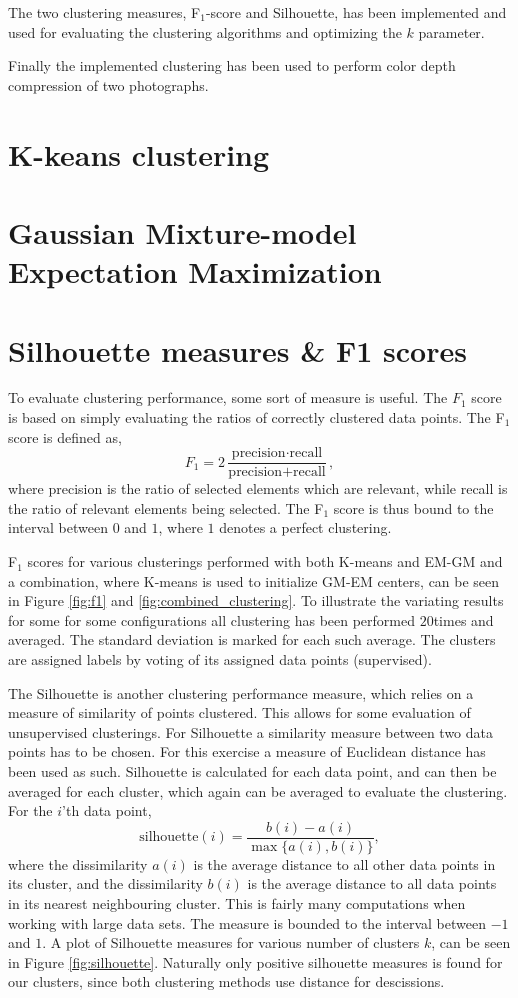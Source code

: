 \documentclass[a4paper,10pt,article,oneside,english]{memoir}
\begin{document}
The two clustering measures, F$_1$-score and Silhouette, has been implemented and used for evaluating the clustering algorithms and optimizing the $k$ parameter. 

Finally the implemented clustering has been used to perform color depth compression of two photographs. 

\section*{K-keans clustering}

\section*{Gaussian Mixture-model Expectation Maximization}



\section*{Silhouette measures \& F1 scores}
To evaluate clustering performance, some sort of measure is useful. The $F_1$ score is based on simply evaluating the ratios of correctly clustered data points. The F$_1$ score is defined as,
$$F_1 = 2 \frac{\text{precision} \cdot \text{recall}}{\text{precision} + \text{recall}},$$
where precision is the ratio of selected elements which are relevant, while recall is the ratio of relevant elements being selected. The F$_1$ score is thus bound to the interval between $0$ and $1$, where $1$ denotes a perfect clustering. 

F$_1$ scores for various clusterings performed with both K-means and EM-GM and a combination, where K-means is used to initialize GM-EM centers, can be seen in Figure \ref{fig:f1} and \ref{fig:combined_clustering}. To illustrate the variating results for some for some configurations all clustering has been performed $20$times and averaged. The standard deviation is marked for each such average. The clusters are assigned labels by voting of its assigned data points (supervised).


The Silhouette is another clustering performance measure, which relies on a measure of similarity of points clustered. This allows for some evaluation of unsupervised clusterings. For Silhouette a similarity measure between two data points has to be chosen. For this exercise a measure of Euclidean distance has been used as such. Silhouette is calculated for each data point, and can then be averaged for each cluster, which again can be averaged to evaluate the clustering. For the $i$'th data point,
$$ \text{silhouette}(i) = \frac{b(i) - a(i)}{\max\{a(i), b(i)\}},$$
where the dissimilarity $a(i)$ is the average distance to all other data points in its cluster, and the dissimilarity $b(i)$ is the average distance to all data points in its nearest neighbouring cluster. This is fairly many computations when working with large data sets. The measure is bounded to the interval between $-1$ and $1$. A plot of Silhouette measures for various number of clusters $k$, can be seen in Figure \ref{fig:silhouette}. Naturally only positive silhouette measures is found for our clusters, since both clustering methods use distance for descissions. 
\end{document}

